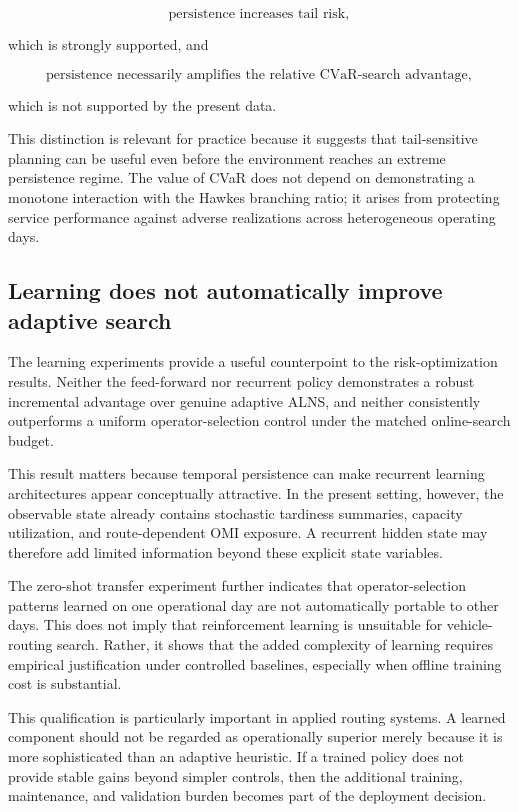 \documentclass[preprint,12pt]{elsarticle}
\newcommand{\1}{\mathbf{1}}
\begin{document}
\[
\text{persistence increases tail risk},
\]

which is strongly supported, and

\[
\text{persistence necessarily amplifies the relative CVaR-search advantage},
\]

which is not supported by the present data.

This distinction is relevant for practice because it suggests that
tail-sensitive planning can be useful even before the environment reaches an
extreme persistence regime. The value of CVaR does not depend on demonstrating
a monotone interaction with the Hawkes branching ratio; it arises from
protecting service performance against adverse realizations across heterogeneous
operating days.

\subsection{Learning does not automatically improve adaptive search}
\label{subsec:discussion_rl}

The learning experiments provide a useful counterpoint to the risk-optimization
results. Neither the feed-forward nor recurrent policy demonstrates a robust
incremental advantage over genuine adaptive ALNS, and neither consistently
outperforms a uniform operator-selection control under the matched online-search
budget.

This result matters because temporal persistence can make recurrent learning
architectures appear conceptually attractive. In the present setting, however,
the observable state already contains stochastic tardiness summaries, capacity
utilization, and route-dependent OMI exposure. A recurrent hidden state may
therefore add limited information beyond these explicit state variables.

The zero-shot transfer experiment further indicates that operator-selection
patterns learned on one operational day are not automatically portable to
other days. This does not imply that reinforcement learning is unsuitable for
vehicle-routing search. Rather, it shows that the added complexity of learning
requires empirical justification under controlled baselines, especially when
offline training cost is substantial.

This qualification is particularly important in applied routing systems.
A learned component should not be regarded as operationally superior merely
because it is more sophisticated than an adaptive heuristic. If a trained policy
does not provide stable gains beyond simpler controls, then the additional
training, maintenance, and validation burden becomes part of the deployment
decision.
\end{document}
